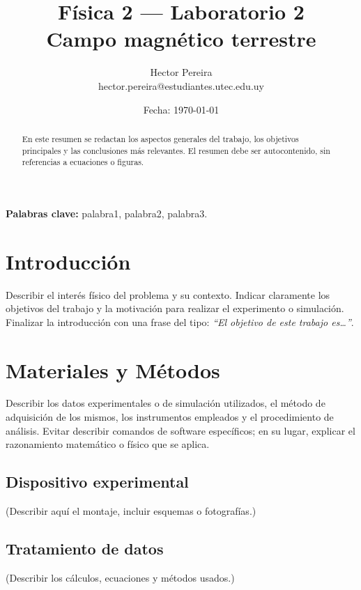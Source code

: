 \documentclass[12pt,a4paper]{article}
\title{\textbf{Física 2 --- Laboratorio 2}\\[0.2cm]
\large Campo magnético terrestre}
\author{
Hector Pereira \\ hector.pereira@estudiantes.utec.edu.uy
}
\date{Fecha: \today}
\begin{document}
\maketitle
\thispagestyle{empty}
\vspace{1cm}
\begin{abstract}
En este resumen se redactan los aspectos generales del trabajo, los objetivos principales y las conclusiones más relevantes. El resumen debe ser autocontenido, sin referencias a ecuaciones o figuras.
\end{abstract}

\vspace{1cm}
\noindent\textbf{Palabras clave:} palabra1, palabra2, palabra3.

\newpage

\section{Introducción}
Describir el interés físico del problema y su contexto.  
Indicar claramente los objetivos del trabajo y la motivación para realizar el experimento o simulación.  
Finalizar la introducción con una frase del tipo:  
\textit{“El objetivo de este trabajo es…”}.

\section{Materiales y Métodos}
Describir los datos experimentales o de simulación utilizados, el método de adquisición de los mismos, los instrumentos empleados y el procedimiento de análisis.  
Evitar describir comandos de software específicos; en su lugar, explicar el razonamiento matemático o físico que se aplica.

\subsection{Dispositivo experimental}
(Describir aquí el montaje, incluir esquemas o fotografías.)

\subsection{Tratamiento de datos}
(Describir los cálculos, ecuaciones y métodos usados.)

\end{document}
